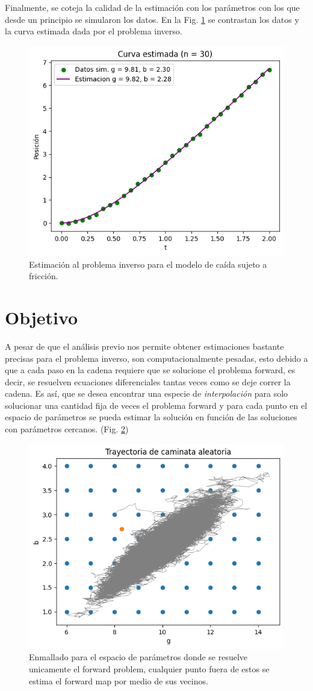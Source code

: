 \documentclass{article}
\begin{document}
Finalmente, se coteja la calidad de la estimación con los parámetros con los que desde un principio se simularon los datos. En la Fig. \ref{Fig. 3.05} se contrastan los datos y la curva estimada dada por el problema inverso.

\begin{figure}
    \centering 
    \includegraphics[width = 8 cm]{Figures/estimacion.png} 
    \caption{Estimación al problema inverso para el modelo de caída sujeto a fricción.}
    \label{Fig. 3.05}
\end{figure} 


\section{Objetivo}

A pesar de que el análisis previo nos permite obtener estimaciones bastante precisas para el problema inverso, son computacionalmente pesadas, esto debido a que a cada paso en la cadena requiere que se solucione el problema forward, es decir, se resuelven ecuaciones diferenciales tantas veces como se deje correr la cadena. Es así, que se desea encontrar una especie de \textit{interpolación} para solo solucionar una cantidad fija de veces el problema forward y para cada punto en el espacio de parámetros se pueda estimar la solución en función de las soluciones con parámetros cercanos. (Fig. \ref{Fig. 3.06})

\begin{figure}
    \centering 
    \includegraphics[width = 8 cm]{Figures/interpolacion.png} 
    \caption{Enmallado para el espacio de parámetros donde se resuelve unicamente el forward problem, cualquier punto fuera de estos se estima el forward map por medio de sus vecinos.}
    \label{Fig. 3.06}
\end{figure} 
\end{document}
